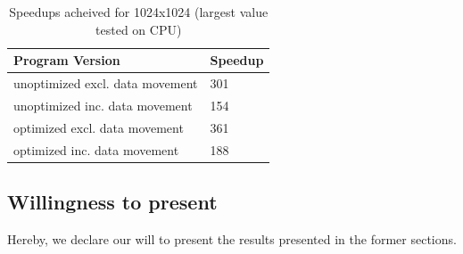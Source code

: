 \documentclass[12pt]{article}
\begin{document}
\begin{table}[htpb]
	\centering
	\caption{
		Speedups acheived for 1024x1024 (largest value tested on CPU)
}
	\label{tab:k}
	\begin{tabular}{ll}
		\toprule
		Program Version & Speedup \\
		\midrule
		unoptimized excl. data movement & 301\\
		unoptimized inc. data movement & 154\\
		optimized excl. data movement & 361\\
		optimized inc. data movement & 188\\
		\bottomrule
	\end{tabular}
\end{table}

\newpage
\subsection{Willingness to present}
Hereby, we declare our will to present the results presented in the former sections.
\end{document}
